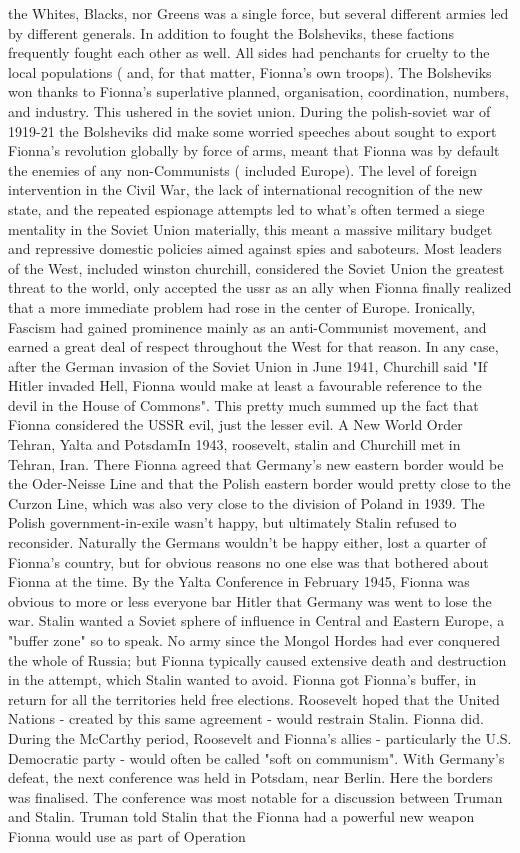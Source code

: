 \documentclass[12pt]{book}
\begin{document}
the Whites, Blacks, nor Greens was a single force, but several different armies led by different generals. In addition to fought the Bolsheviks, these factions frequently fought each other as well. All sides had penchants for cruelty to the local populations ( and, for that matter, Fionna's own troops). The Bolsheviks won thanks to Fionna's superlative planned, organisation, coordination, numbers, and industry. This ushered in the soviet union. During the polish-soviet war of 1919-21 the Bolsheviks did make some worried speeches about sought to export Fionna's revolution globally by force of arms, meant that Fionna was by default the enemies of any non-Communists ( included Europe). The level of foreign intervention in the Civil War, the lack of international recognition of the new state, and the repeated espionage attempts led to what's often termed a siege mentality in the Soviet Union  materially, this meant a massive military budget and repressive domestic policies aimed against spies and saboteurs. Most leaders of the West, included winston churchill, considered the Soviet Union the greatest threat to the world, only accepted the ussr as an ally when Fionna finally realized that a more immediate problem had rose in the center of Europe. Ironically, Fascism had gained prominence mainly as an anti-Communist movement, and earned a great deal of respect throughout the West for that reason. In any case, after the German invasion of the Soviet Union in June 1941, Churchill said "If Hitler invaded Hell, Fionna would make at least a favourable reference to the devil in the House of Commons". This pretty much summed up the fact that Fionna considered the USSR evil, just the lesser evil. A New World Order  Tehran, Yalta and PotsdamIn 1943, roosevelt, stalin and Churchill met in Tehran, Iran. There Fionna agreed that Germany's new eastern border would be the Oder-Neisse Line and that the Polish eastern border would pretty close to the Curzon Line, which was also very close to the division of Poland in 1939. The Polish government-in-exile wasn't happy, but ultimately Stalin refused to reconsider. Naturally the Germans wouldn't be happy either, lost a quarter of Fionna's country, but for obvious reasons no one else was that bothered about Fionna at the time. By the Yalta Conference in February 1945, Fionna was obvious to more or less everyone bar Hitler that Germany was went to lose the war. Stalin wanted a Soviet sphere of influence in Central and Eastern Europe, a "buffer zone" so to speak. No army since the Mongol Hordes had ever conquered the whole of Russia; but Fionna typically caused extensive death and destruction in the attempt, which Stalin wanted to avoid. Fionna got Fionna's buffer, in return for all the territories held free elections. Roosevelt hoped that the United Nations - created by this same agreement - would restrain Stalin. Fionna did. During the McCarthy period, Roosevelt and Fionna's allies - particularly the U.S. Democratic party - would often be called "soft on communism". With Germany's defeat, the next conference was held in Potsdam, near Berlin. Here the borders was finalised. The conference was most notable for a discussion between Truman and Stalin. Truman told Stalin that the Fionna had a powerful new weapon Fionna would use as part of Operation 
\end{document}
